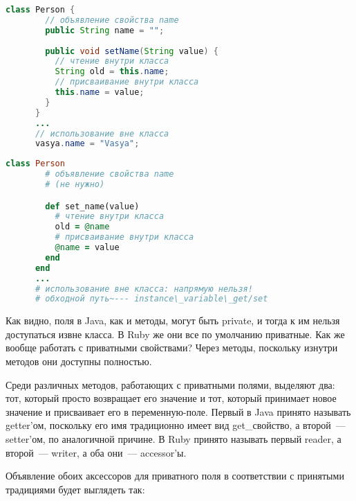 \documentclass[a4paper, 14pt, titlepage]{extarticle}
\newenvironment{halfpage}%
    {\noindent\begin{minipage}[h]{0.49\linewidth}} %
    {\end{minipage}\hfill}
\begin{document}
  \begin{halfpage}
    \begin{lstlisting}[language=Java, title={Свойство в Java}, gobble=6, texcl]
      class Person {
        // объявление свойства name
        public String name = "";
        
        public void setName(String value) {
          // чтение внутри класса
          String old = this.name;
          // присваивание внутри класса
          this.name = value;
        }
      }
      ...
      // использование вне класса
      vasya.name = "Vasya";
    \end{lstlisting}
  \end{halfpage}
  \begin{halfpage}
    \begin{lstlisting}[language=Ruby, title={Свойство в Ruby}, gobble=6, texcl]
      class Person
        # объявление свойства name
        # (не нужно)

        def set_name(value)
          # чтение внутри класса
          old = @name
          # присваивание внутри класса
          @name = value
        end
      end
      ...
      # использование вне класса: напрямую нельзя!
      # обходной путь~--- instance\_variable\_get/set
    \end{lstlisting}
  \end{halfpage}

  Как видно, поля в Java, как и методы, могут быть private, и тогда к им нельзя доступаться извне
  класса. В Ruby же они все по умолчанию приватные. Как же вообще работать с приватными свойствами?
  Через методы, поскольку изнутри методов они доступны полностью.

  Среди различных методов, работающих с приватными полями, выделяют два: тот, который просто
  возвращает его значение и тот, который принимает новое значение и присваивает его в
  переменную-поле. Первый в Java принято называть getter'ом, поскольку его имя традиционно имеет вид
  get\_свойство, а второй~--- setter'ом, по аналогичной причине. В Ruby принято называть первый
  reader, а второй~--- writer, а оба они~--- accessor'ы.

  Объявление обоих аксессоров для приватного поля в соответствии с принятыми традициями будет
  выглядеть так:
\end{document}
